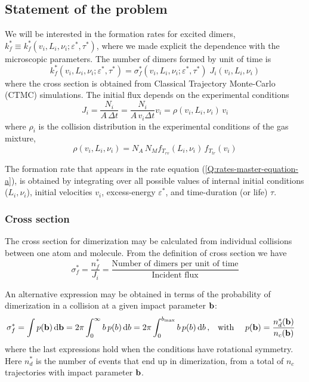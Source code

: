 \subsection{Statement of the problem}
\label{S:statement-problem}

We will be interested in the formation rates for excited dimers, $k_{f}^{*} \equiv k_{f}^{*}(v_{i}, L_{i}, \nu_{i} ; \varepsilon^{*}, \tau^{*})$, where we made explicit the dependence with the microscopic parameters. The number of dimers formed by unit of time is
\begin{equation}
  \label{Q:def-dimer-rate}
  k_{f}^{*}(v_{i}, L_{i}, \nu_{i} ; \varepsilon^{*}, \tau^{*}) = \sigma_{f}^{*}(v_{i}, L_{i}, \nu_{i} ; \varepsilon^{*}, \tau^{*}) \; J_{i}(v_{i}, L_{i}, \nu_{i} )
\end{equation}
where the cross section is obtained from Classical Trajectory Monte-Carlo (CTMC) simulations. The initial flux depends on the experimental conditions
\begin{equation}
  \label{Q:rates-flux}
  J_{i} =\frac{N_{i}}{A \,\Delta t} = \frac{N_{i}}{A \, v_{i} \Delta t} v_{i} = \rho(v_{i}, L_{i}, \nu_{i})\, v_{i}
\end{equation}
%
where $\rho_{i}$ is the collision distribution in the experimental conditions of the gas mixture,
\begin{equation}
  \label{Q:rates-def-collis-distrib}
  \rho(v_{i}, L_{i}, \nu_{i}) = N_{A} \, N_{M} f_{T_{rv}}(L_{i},\nu_{i}) \, f_{T_{tr}}(v_{i})
\end{equation}

The formation rate that appears in the rate equation (\ref{Q:rates-master-equation-a}), is obtained by integrating over all possible values of internal initial conditions ($L_{i},\nu_{i}$), initial velocities $v_{i}$, excess-energy $\varepsilon^{*}$, and time-duration (or life) $\tau$.
\subsubsection{Cross section}
\label{S:cross-section}

The cross section for dimerization may be calculated from individual collisions between one atom and molecule. 
From the definition of cross section we have
\begin{equation*}
  \sigma_{f}^{*} = \frac{n_{f}^{*}}{J_{i}}= \frac{\text{Number of dimers per unit of time}}{\text{Incident flux}}
\end{equation*}

An alternative expression may be obtained in terms of the probability of dimerization in a collision at a given impact parameter $\mathbf{b}$:
\begin{align}
  \label{Q:rates-def-probab}
  \sigma_{f}^{*} = \int p(\mathbf{b})\,\mathrm{d} \mathbf{b} = 2 \pi \int_{0}^{\infty} b \, p(b) \,\mathrm{d} b = 2 \pi \int_{0}^{b_{\text{max}}} b \, p(b) \,\mathrm{d} b\,, & \quad \text{with } \quad  p(\mathbf{b}) = \frac{n_{d}^{*}(\mathbf{b})}{n_{c}(\mathbf{b})}
\end{align}
where the last expressions hold when the conditions have rotational symmetry. Here $n_{d}^{*}$ is the number of events that end up in dimerization, from a total of $n_{c}$ trajectories with impact parameter $\mathbf{b}$.

